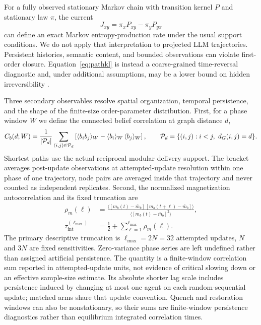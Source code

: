 \documentclass[12pt]{article}
\begin{document}
For a fully observed stationary Markov chain with transition kernel $P$ and
stationary law $\pi$, the current
\begin{equation}
J_{xy}=\pi_xP_{xy}-\pi_yP_{yx}
\end{equation}
can define an exact Markov entropy-production rate under the usual support
conditions.  We do not apply that interpretation to projected LLM trajectories.
Persistent histories, semantic content, and bounded observations can violate
first-order closure.  Equation~\eqref{eq:pathkl} is instead a coarse-grained
time-reversal diagnostic and, under additional assumptions, may be a lower
bound on hidden irreversibility \cite{roldan2012,busiello2019,liang2023}.

Three secondary observables resolve
spatial organization, temporal persistence, and the shape of the finite-size
order-parameter distribution.  First, for a phase window $W$ we define the
connected belief correlation at graph distance $d$,
\begin{equation}
C_b(d;W)=\frac{1}{|{\cal P}_d|}\sum_{(i,j)\in{\cal P}_d}
\left[\langle b_i b_j\rangle_W-\langle b_i\rangle_W
\,\langle b_j\rangle_W\right],\qquad
{\cal P}_d=\{(i,j):i<j,\ d_G(i,j)=d\}.
\label{eq:connected-correlation}
\end{equation}
Shortest paths use the actual reciprocal modular delivery support.  The
bracket averages post-update observations at attempted-update resolution
within one phase of one
trajectory, node pairs are averaged inside that trajectory and never counted
as independent replicates.
Second, the normalized magnetization autocorrelation and its fixed truncation
are
\begin{align}
\rho_m(\ell)&=\frac{\langle[m_b(t)-\bar m_b]
\,[m_b(t+\ell)-\bar m_b]\rangle}
{\langle[m_b(t)-\bar m_b]^2\rangle},\nonumber\\
\tau_{\mathrm{int}}^{(\ell_{\max})}&=\frac{1}{2}+
\sum_{\ell=1}^{\ell_{\max}}\rho_m(\ell).
\label{eq:autocorrelation}
\end{align}
The primary descriptive truncation is $\ell_{\max}=2N=32$ attempted updates,
$N$ and $3N$ are fixed sensitivities.  Zero-variance phase series are left
undefined rather than assigned artificial persistence.  The quantity is a
finite-window correlation sum reported in attempted-update units, not evidence
of critical slowing down or an effective sample-size estimate.  Its absolute
shorter lag scale includes persistence induced by changing at most one agent on
each random-sequential update; matched arms share that update convention.
Quench and restoration windows can also be nonstationary, so their sums are
finite-window persistence diagnostics rather than equilibrium integrated
correlation times.
\end{document}
